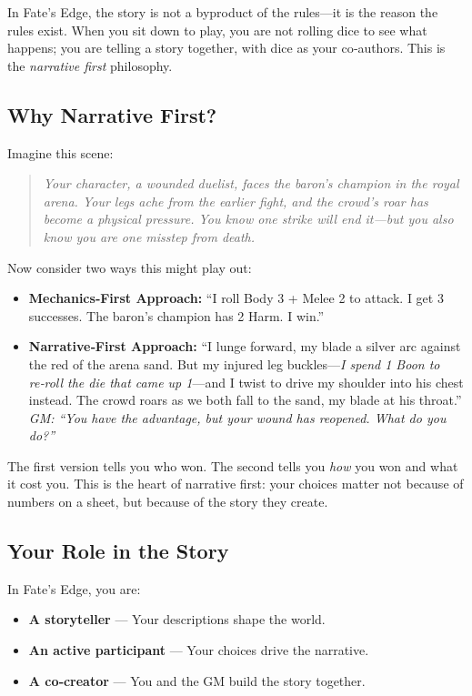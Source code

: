 In Fate's Edge, the story is not a byproduct of the rules—it is the reason the rules exist. When you sit down to play, you are not rolling dice to see what happens; you are telling a story together, with dice as your co‑authors. This is the \textit{narrative first} philosophy.

\subsection{Why Narrative First?}

Imagine this scene:

\begin{quote}
\itshape Your character, a wounded duelist, faces the baron’s champion in the royal arena. Your legs ache from the earlier fight, and the crowd’s roar has become a physical pressure. You know one strike will end it—but you also know you are one misstep from death.
\end{quote}

Now consider two ways this might play out:

\begin{itemize}
\item \textbf{Mechanics‑First Approach:} “I roll Body 3 + Melee 2 to attack. I get 3 successes. The baron’s champion has 2 Harm. I win.”

\item \textbf{Narrative‑First Approach:} “I lunge forward, my blade a silver arc against the red of the arena sand. But my injured leg buckles—\textit{I spend 1 Boon to re‑roll the die that came up 1}—and I twist to drive my shoulder into his chest instead. The crowd roars as we both fall to the sand, my blade at his throat.”  
\emph{GM: “You have the advantage, but your wound has reopened. What do you do?”}
\end{itemize}

The first version tells you who won. The second tells you \textit{how} you won and what it cost you. This is the heart of narrative first: your choices matter not because of numbers on a sheet, but because of the story they create.

\subsection{Your Role in the Story}

In Fate's Edge, you are:
\begin{itemize}
\item \textbf{A storyteller} — Your descriptions shape the world.
\item \textbf{An active participant} — Your choices drive the narrative.
\item \textbf{A co‑creator} — You and the GM build the story together.
\end{itemize}

